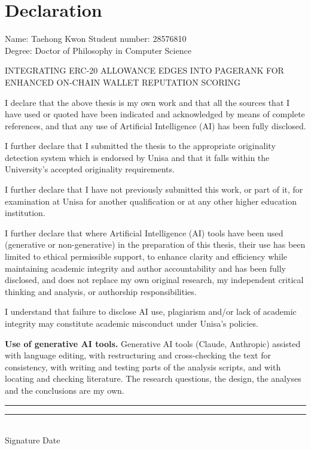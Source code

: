 
\clearpage
{}
\chapter*{Declaration}
\label{ch:declaration}

\begingroup{}
\noindent Name: Taehong Kwon \hfill Student number: 28576810\\
Degree: Doctor of Philosophy in Computer Science

\smallskip
\noindent INTEGRATING ERC-20 ALLOWANCE EDGES INTO PAGERANK FOR ENHANCED ON-CHAIN WALLET REPUTATION SCORING

\smallskip
I declare that the above thesis is my own work and that all the sources that I have used or quoted have been indicated and acknowledged by means of complete references, and that any use of Artificial Intelligence (AI) has been fully disclosed.

I further declare that I submitted the thesis to the appropriate originality detection system which is endorsed by Unisa and that it falls within the University's accepted originality requirements.

I further declare that I have not previously submitted this work, or part of it, for examination at Unisa for another qualification or at any other higher education institution.

I further declare that where Artificial Intelligence (AI) tools have been used (generative or non-generative) in the preparation of this thesis, their use has been limited to ethical permissible support, to enhance clarity and efficiency while maintaining academic integrity and author accountability and has been fully disclosed, and does not replace my own original research, my independent critical thinking and analysis, or authorship responsibilities.

I understand that failure to disclose AI use, plagiarism and/or lack of academic integrity may constitute academic misconduct under Unisa's policies.

\smallskip
\noindent\textbf{Use of generative AI tools.} Generative AI tools (Claude, Anthropic) assisted with language editing, with restructuring and cross-checking the text for consistency, with writing and testing parts of the analysis scripts, and with locating and checking literature. The research questions, the design, the analyses and the conclusions are my own.

\vspace{1.8em}
\noindent\rule{6cm}{0.4pt}\hfill\rule{4cm}{0.4pt}\\
Signature \hfill Date
\par\endgroup
